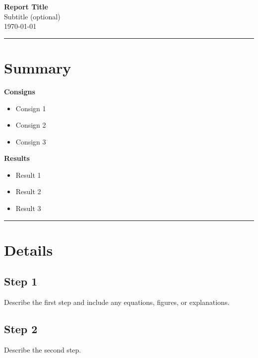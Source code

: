 \documentclass[11pt]{article}
\begin{document}

\begin{center}
    {\LARGE \textbf{Report Title}}\\[0.5em]
    {\large Subtitle (optional)}\\[0.5em]
    \today
\end{center}

\vspace{0.5em}
\hrule
\vspace{1em}


\section*{Summary}

\textbf{Consigns}
\begin{itemize}
    \item Consign 1
    \item Consign 2
    \item Consign 3
\end{itemize}

\textbf{Results}
\begin{itemize}
    \item Result 1
    \item Result 2
    \item Result 3
\end{itemize}

\vspace{1em}
\hrule
\vspace{1em}


\section*{Details}

\subsection*{Step 1}
Describe the first step and include any equations, figures, or explanations.

\subsection*{Step 2}
Describe the second step.
\end{document}
